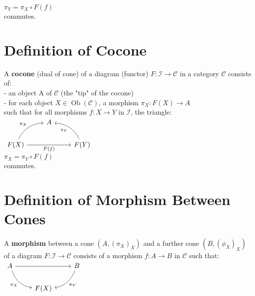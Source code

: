 \documentclass[a4paper, twoside, english, 11pt]{book}
\DeclareMathOperator{\Ob}{Ob}
\newcommand{\C}{\mathcal C}
\newcommand{\I}{\mathcal I}
\begin{document}
$\pi_Y = \pi_X \circ F(f)$ \\

\noindent
commutes.



\section{Definition of Cocone}

A \textbf{cocone} (dual of cone) of a diagram (functor) $F : \I \rightarrow \C$ in a category $\C$ consists of: \\

- an object A of $\C$ (the "tip" of the cocone) \\

- for each object $X \in \Ob(\C)$, a morphism $\pi_X : F(X) \rightarrow A$ \\

\noindent
such that for all morphisms $f: X \rightarrow Y$ in $\I$, the triangle: \\

$\begin{tikzcd}
                                                        & A &                                      \\
F(X) \arrow[rr, "F(f)"'] \arrow[ru, "\pi_X", bend left] &   & F(Y) \arrow[lu, "\pi_Y", bend right]
\end{tikzcd}$ \\

$\pi_X = \pi_Y \circ F(f)$ \\

\noindent
commutes.



\section{Definition of Morphism Between Cones}

A \textbf{morphism} between a cone $(A, (\pi_X)_X)$ and a further cone $(B, (\phi_X)_X)$ of a diagram $F : \I \rightarrow \C$ consists of a morphism $f : A \rightarrow B$ in $\C$ such that: \\

$\begin{tikzcd}
A \arrow[rr] \arrow[rd, "\pi_X"', bend right] &      & B \arrow[ld, "\pi_Y", bend left] \\
                                              & F(X) &
\end{tikzcd}$ \\
\end{document}
